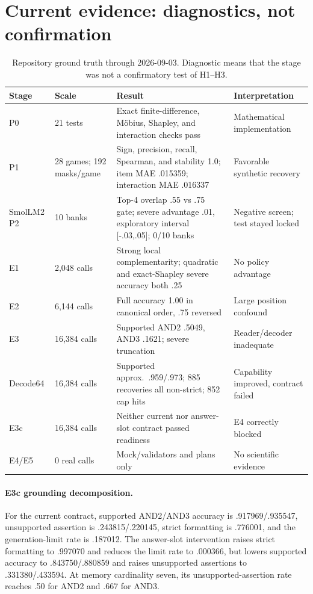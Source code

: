 \section{Current evidence: diagnostics, not confirmation}
\label{sec:evidence}

\begin{table}[t]
\caption{Repository ground truth through 2026-09-03. Diagnostic means that the
stage was not a confirmatory test of H1--H3.}
\label{tab:evidence}
\centering
\small
\setlength{\tabcolsep}{3pt}
\begin{tabular}{@{}p{0.65in}p{0.90in}p{2.63in}p{1.02in}@{}}
\toprule
Stage & Scale & Result & Interpretation \\
\midrule
P0 & 21 tests & Exact finite-difference, M\"obius, Shapley, and interaction checks pass & Mathematical implementation \\
P1 & 28 games; 192 masks/game & Sign, precision, recall, Spearman, and stability 1.0; item MAE .015359; interaction MAE .016337 & Favorable synthetic recovery \\
SmolLM2 P2 & 10 banks & Top-4 overlap .55 vs .75 gate; severe advantage .01, exploratory interval [-.03,.05]; 0/10 banks & Negative screen; test stayed locked \\
E1 & 2,048 calls & Strong local complementarity; quadratic and exact-Shapley severe accuracy both .25 & No policy advantage \\
E2 & 6,144 calls & Full accuracy 1.00 in canonical order, .75 reversed & Large position confound \\
E3 & 16,384 calls & Supported AND2 .5049, AND3 .1621; severe truncation & Reader/decoder inadequate \\
Decode64 & 16,384 calls & Supported approx.\ .959/.973; 885 recoveries all non-strict; 852 cap hits & Capability improved, contract failed \\
E3c & 16,384 calls & Neither current nor answer-slot contract passed readiness & E4 correctly blocked \\
E4/E5 & 0 real calls & Mock/validators and plans only & No scientific evidence \\
\bottomrule
\end{tabular}
\end{table}

\paragraph{E3c grounding decomposition.}
For the current contract, supported AND2/AND3 accuracy is .917969/.935547,
unsupported assertion is .243815/.220145, strict formatting is .776001, and the
generation-limit rate is .187012. The answer-slot intervention raises strict
formatting to .997070 and reduces the limit rate to .000366, but lowers supported
accuracy to .843750/.880859 and raises unsupported assertions to
.331380/.433594. At memory cardinality seven, its unsupported-assertion rate reaches
.50 for AND2 and .667 for AND3.

